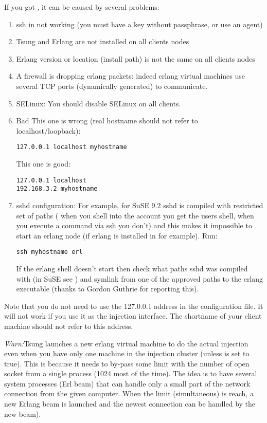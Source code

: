 \documentclass{TSUNG-en}
\begin{document}
\begin{appendix}
If you got , it can be caused by
several problems:
\begin{enumerate}
\item ssh in not working (you must have a key without passphrase, or
  use an agent)
\item Tsung and Erlang are not installed on all clients nodes
\item Erlang version or location (install path) is not the same on all clients nodes
\item A firewall is dropping erlang packets: indeed erlang virtual machines use
several TCP ports (dynamically generated) to communicate.
\item SELinux: You should disable SELinux on all clients.
\item Bad 
This one is wrong (real hostname should not refer to localhost/loopback):
\begin{Verbatim}
127.0.0.1 localhost myhostname
\end{Verbatim}
This one is good:
\begin{Verbatim}
127.0.0.1 localhost
192.168.3.2 myhostname
\end{Verbatim}
\item sshd configuration:
For example, for SuSE 9.2 sshd is compiled with restricted set of
paths (\ie{} when you shell into the account you get the users shell,
when you execute a command via ssh you don't) and this makes it
impossible to start an erlang node (if erlang is installed in
 for example).
Run:

\begin{Verbatim}
ssh myhostname erl
\end{Verbatim}

If the erlang shell doesn't start then check what paths sshd was compiled with
(in SuSE see ) and symlink from one of the approved paths
to the erlang executable (thanks to Gordon Guthrie for reporting this).
\end{enumerate}


Note that you do not need to use the 127.0.0.1 address in the configuration file.
It will not work if you use it as the injection interface. The shortname
of your client machine should not refer to this address.

\emph{Warn:}Tsung launches a new erlang virtual machine to do the actual injection
even when you have only one machine in the injection cluster (unless
 is set to true). This is because it
needs to by-pass some limit with the number of open socket from a
single process (1024 most of the time). The idea is to have several
system processes (Erl beam) that can handle only a small part of the
network connection from the given computer. When the
 limit (simultaneous) is reach, a new Erlang beam
is launched and the newest connection can be handled by the new beam).


\end{appendix}
\end{document}
